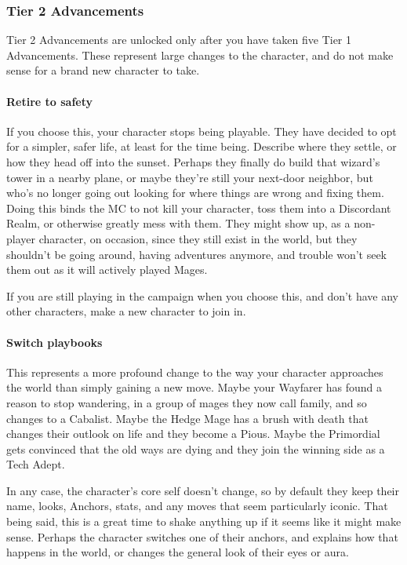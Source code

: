 \documentclass[
]{article}
\begin{document}
\hypertarget{tier-2-advancements}{%
\subsubsection{Tier 2 Advancements}\label{tier-2-advancements}}

Tier 2 Advancements are unlocked only after you have taken five Tier 1
Advancements. These represent large changes to the character, and do not
make sense for a brand new character to take.

\hypertarget{retire-to-safety}{%
\paragraph{Retire to safety}\label{retire-to-safety}}

If you choose this, your character stops being playable. They have
decided to opt for a simpler, safer life, at least for the time being.
Describe where they settle, or how they head off into the sunset.
Perhaps they finally do build that wizard's tower in a nearby plane, or
maybe they're still your next-door neighbor, but who's no longer going
out looking for where things are wrong and fixing them. Doing this binds
the MC to not kill your character, toss them into a Discordant Realm, or
otherwise greatly mess with them. They might show up, as a non-player
character, on occasion, since they still exist in the world, but they
shouldn't be going around, having adventures anymore, and trouble won't
seek them out as it will actively played Mages.

If you are still playing in the campaign when you choose this, and don't
have any other characters, make a new character to join in.

\hypertarget{switch-playbooks}{%
\paragraph{Switch playbooks}\label{switch-playbooks}}

This represents a more profound change to the way your character
approaches the world than simply gaining a new move. Maybe your Wayfarer
has found a reason to stop wandering, in a group of mages they now call
family, and so changes to a Cabalist. Maybe the Hedge Mage has a brush
with death that changes their outlook on life and they become a Pious.
Maybe the Primordial gets convinced that the old ways are dying and they
join the winning side as a Tech Adept.

In any case, the character's core self doesn't change, so by default
they keep their name, looks, Anchors, stats, and any moves that seem
particularly iconic. That being said, this is a great time to shake
anything up if it seems like it might make sense. Perhaps the character
switches one of their anchors, and explains how that happens in the
world, or changes the general look of their eyes or aura.
\end{document}
